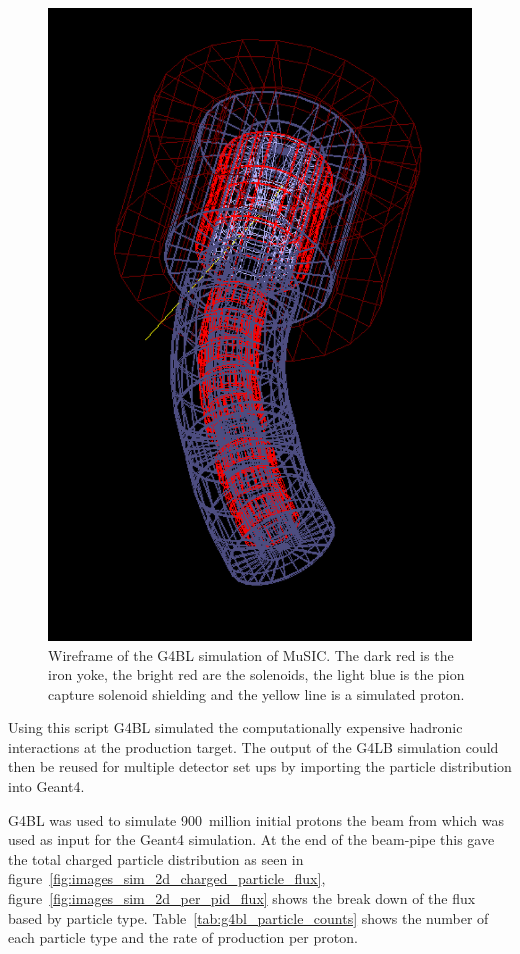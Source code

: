 \begin{figure}[hptb]
  \centering
    \includegraphics[width=.9\textwidth]{images/Geometry/g4bl_wireframe.png}
  \caption{Wireframe of the G4BL simulation of MuSIC. The dark red is the iron yoke, the bright red are the solenoids, the light blue is the pion capture solenoid shielding and the yellow line is a simulated proton.}
  \label{fig:images_Geometry_g4bl_wireframe}
\end{figure}

Using this script G4BL simulated the computationally expensive hadronic interactions at the production target. The output of the G4LB simulation could then be reused for multiple detector set ups by importing the particle distribution into Geant4.

G4BL was used to simulate 900~million initial protons the beam from which was used as input for the Geant4 simulation. At the end of the beam-pipe this gave the total charged particle distribution as seen in figure~\ref{fig:images_sim_2d_charged_particle_flux}, figure~\ref{fig:images_sim_2d_per_pid_flux} shows the break down of the flux based by particle type. Table~\ref{tab:g4bl_particle_counts} shows the number of each particle type and the rate of production per proton. 

